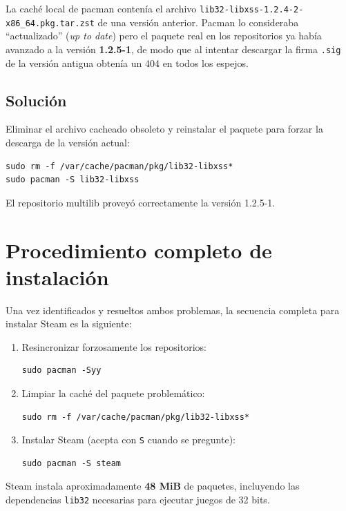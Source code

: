 \documentclass[12pt,a4paper]{article}
\begin{document}
La caché local de pacman contenía el archivo
\texttt{lib32-libxss-1.2.4-2-x86\_64.pkg.tar.zst} de una versión anterior.
Pacman lo consideraba ``actualizado'' (\emph{up to date}) pero el paquete real
en los repositorios ya había avanzado a la versión \textbf{1.2.5-1}, de modo
que al intentar descargar la firma \texttt{.sig} de la versión antigua obtenía
un 404 en todos los espejos.

\subsection{Solución}

Eliminar el archivo cacheado obsoleto y reinstalar el paquete para forzar la
descarga de la versión actual:

\begin{lstlisting}[style=bash]
sudo rm -f /var/cache/pacman/pkg/lib32-libxss*
sudo pacman -S lib32-libxss
\end{lstlisting}

El repositorio multilib proveyó correctamente la versión 1.2.5-1.

\section{Procedimiento completo de instalación}

Una vez identificados y resueltos ambos problemas, la secuencia completa
para instalar Steam es la siguiente:

\begin{enumerate}
  \item Resincronizar forzosamente los repositorios:
\begin{lstlisting}[style=bash]
sudo pacman -Syy
\end{lstlisting}

  \item Limpiar la caché del paquete problemático:
\begin{lstlisting}[style=bash]
sudo rm -f /var/cache/pacman/pkg/lib32-libxss*
\end{lstlisting}

  \item Instalar Steam (acepta con \texttt{S} cuando se pregunte):
\begin{lstlisting}[style=bash]
sudo pacman -S steam
\end{lstlisting}
\end{enumerate}

Steam instala aproximadamente \textbf{48 MiB} de paquetes, incluyendo las
dependencias \texttt{lib32} necesarias para ejecutar juegos de 32 bits.
\end{document}
